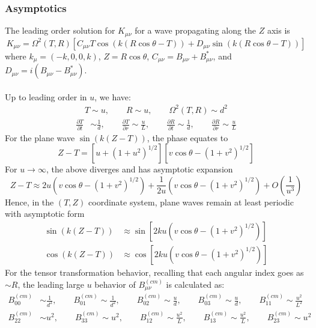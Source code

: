 \documentclass[10pt,letterpaper]{article}
\begin{document}
\subsubsection*{Asymptotics}
The leading order solution for $K_{\mu\nu}$ for a wave propagating along the $Z$ axis is
\begin{equation}
K_{\mu\nu} = \Omega^2(T,R)\left[ C_{\mu\nu} T \cos(k(R\cos\theta - T)) + D_{\mu\nu} \sin(k(R\cos\theta - T)) \right]
\end{equation}
where $k_{\mu} = (-k,0,0,k)$, $Z = R\cos\theta$, $C_{\mu\nu} = B_{\mu\nu}+B^*_{\mu\nu} $, and $D_{\mu\nu} = i(B_{\mu\nu}-B^*_{\mu\nu})$.
\\ \\
Up to leading order in $u$, we have:
\begin{align}
T\sim u,\qquad R \sim u,\qquad \Omega^2(T,R) \sim d^2
\end{align}
\begin{align}
\frac{\partial T}{\partial t} & \sim \frac{1}{d},\qquad
\frac{\partial T}{\partial r}  \sim 	\frac{u}{L},\qquad
\frac{\partial R}{\partial t}  \sim \frac{1}{d},\qquad
\frac{\partial R}{\partial r}  \sim \frac{u}{L}
\end{align}
For the plane wave $\sin(k(Z-T))$, the phase equates to
\begin{equation}
Z-T = \left[u+(1+u^2)^{1/2}\right]\left[v\cos\theta - ( 1+v^2)^{1/2}\right]
\end{equation}
For $u \to \infty$, the above diverges and has asymptotic expansion
\begin{equation}
Z-T \approx 2 u \left( v\cos\theta - (1+v^2)^{1/2}\right) + \frac{1}{2u}\left( v\cos\theta - (1+v^2)^{1/2}\right) + O\left( \frac{1}{u^3}\right)
\end{equation}
Hence, in the $(T,Z)$ coordinate system, plane waves remain at least periodic with asymptotic form
\begin{align}
\sin(k(Z-T)) &\approx \sin\left[ 2 k u \left( v\cos\theta - (1+v^2)^{1/2}\right)\right]\nonumber\\
\cos(k(Z-T)) &\approx \cos\left[ 2 k u \left( v\cos\theta - (1+v^2)^{1/2}\right)\right]
\end{align}
For the tensor transformation behavior, recalling that each angular index goes as $\sim R$, the leading large $u$ behavior of $B_{\mu\nu}^{(cm)}$ is calculated as:
\begin{align}
B^{(cm)}_{00} &\sim \frac{1}{d^2},\qquad 
B^{(cm)}_{01} \sim \frac{1}{d^2},\qquad 
B^{(cm)}_{02} \sim \frac{u}{d},\qquad 
B^{(cm)}_{03} \sim \frac{u}{d} ,\qquad 
B^{(cm)}_{11} \sim \frac{u^2}{L^2} \nonumber\\
B^{(cm)}_{22} &\sim u^2 ,\qquad 
B^{(cm)}_{33} \sim u^2 ,\qquad 
B^{(cm)}_{12} \sim \frac{u^2}{L} ,\qquad 
B^{(cm)}_{13} \sim \frac{u^2}{L} ,\qquad 
B^{(cm)}_{23} \sim u^2
\end{align}
\end{document}
